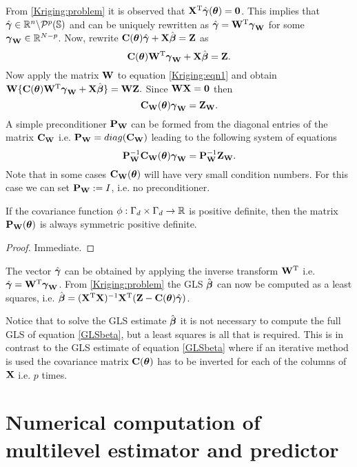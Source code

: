 \documentclass[11pt,final]{amsart}       %
\begin{document}
From \eqref{Kriging:problem} it is observed that $\mathbf{X}^{\rm T} \hat
{\boldsymbol{\gamma}}(\boldsymbol{\theta}) = \mathbf{0}$. This implies that $\hat{\boldsymbol{\gamma}} \in \Bbb{R}^{n}
\backslash {\mathcal P}^{p}(\mathbb{S})$ and can be uniquely rewritten as
$\hat{\boldsymbol{\gamma}} = \mathbf{W}^{\rm T} \boldsymbol{\gamma}_{\mathbf{W}}$ for some $\boldsymbol{\gamma}_{\mathbf{W}} \in
\Bbb{R}^{N-p}$. Now, rewrite $\mathbf{C}(\boldsymbol{\theta}) \hat {\boldsymbol{\gamma}} + \mathbf{X} \hat {\boldsymbol{\beta}}
= \mathbf{Z}$ as
\begin{equation}
\mathbf{C}(\boldsymbol{\theta}) \mathbf{W}^{\rm T} \boldsymbol{\gamma}_{\mathbf{W}} + \mathbf{X} \hat {\boldsymbol{\beta}} =
       \mathbf{Z}.
\label{Kriging:eqn1}
\end{equation}
Now apply the matrix $\mathbf{W}$ to equation \eqref{Kriging:eqn1} and obtain
$\mathbf{W} \{\mathbf{C}(\boldsymbol{\theta}) \mathbf{W}^{\rm T} \boldsymbol{\gamma}_{\mathbf{W}} + \mathbf{X} \hat {\boldsymbol{\beta}}\} = \mathbf{W}
\mathbf{Z}.$ Since $\mathbf{W} \mathbf{X} = \mathbf{0}$ then
\[
\mathbf{C}_{\mathbf{W}}(\boldsymbol{\theta})
\boldsymbol{\gamma}_{\mathbf{W}} = \mathbf{Z}_{\mathbf{W}}.
\]
A simple preconditioner $\mathbf{P}_{\mathbf{W}}$ can be formed from the diagonal
entries of the matrix $\mathbf{C}_{\mathbf{W}}$ i.e. $\mathbf{P}_{\mathbf{W}} = diag(\mathbf{C}_{\mathbf{W}})$ leading
to the following system of equations
\[
\mathbf{P}_{\mathbf{W}}^{-1}\mathbf{C}_{\mathbf{W}}(\boldsymbol{\theta})
\boldsymbol{\gamma}_{\mathbf{W}} = \mathbf{P}_{\mathbf{W}}^{-1} \mathbf{Z}_{\mathbf{W}}.
\]
Note that in some cases $\mathbf{C}_{\mathbf{W}}(\boldsymbol{\theta})$ will have very small
condition numbers. For this case we can set $\mathbf{P}_{\mathbf{W}}:= I$, i.e. no
preconditioner.

\begin{theorem}
If the covariance function $\phi:\Gamma_d \times \Gamma_d \rightarrow
\Bbb{R}$ is positive definite, then the matrix $\mathbf{P}_{\mathbf{W}}(\boldsymbol{\theta})$ is always
symmetric positive definite.
\label{multilevelKriging:lemma2}
\end{theorem}
\begin{proof}
Immediate.
\end{proof}


The vector $\hat {\boldsymbol{\gamma}}$ can be obtained by applying the inverse
transform $\mathbf{W}^{\rm T}$ i.e.  $\hat {\boldsymbol{\gamma}} = \mathbf{W}^{\rm T} \boldsymbol{\gamma}_{\mathbf{W}}$.  From
\eqref{Kriging:problem} the GLS $\hat {\boldsymbol{\beta}}$ can now be computed as a
least squares, i.e.  $\hat{\boldsymbol{\beta}} = (\mathbf{X}^{\rm T} \mathbf{X})^{-1}\mathbf{X} ^{\rm T} (\mathbf{Z} -
\mathbf{C}(\boldsymbol{\theta})\hat{\boldsymbol{\gamma}})$.


\begin{remark}
  Notice that to solve the GLS estimate $\hat {\boldsymbol{\beta}}$ it is not
  necessary to compute the full GLS of equation \eqref{GLSbeta}, but a
  least squares is all that is required. This is in contrast to the
  GLS estimate of equation \eqref{GLSbeta} where if an iterative
  method is used the covariance matrix $\mathbf{C}(\boldsymbol{\theta})$ has to be
  inverted for each of the columns of $\mathbf{X}$ i.e. $p$ times.
  \end{remark}


\section{Numerical computation of multilevel estimator and predictor}
\label{numericalcomputation}
\end{document}

